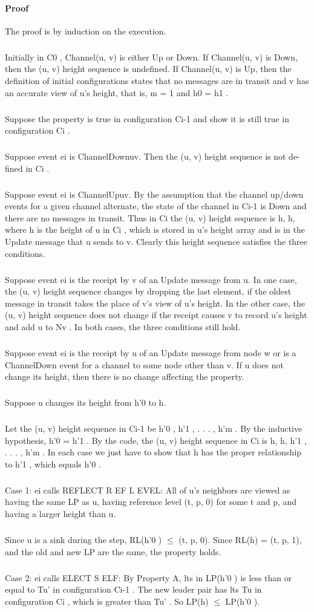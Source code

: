 \paragraph{Proof}The proof is by induction on the execution.
\subparagraph{}Initially in C0 , Channel(u, v) is either Up or Down. If Channel(u, v) is Down, then the (u, v) height sequence is undefined. If Channel(u, v) is Up, then the definition of initial configurations states that no messages are in transit and v has an accurate view of u’s height, that is, m = 1 and h0 = h1 .
\subparagraph{}Suppose the property is true in configuration Ci-1 and show it is still true in configuration Ci .
\subparagraph{}Suppose event ei is ChannelDownuv. Then the (u, v) height sequence is not de- fined in Ci .
\subparagraph{}Suppose event ei is ChannelUpuv. By the assumption that the channel up/down events for a given channel alternate, the state of the channel in Ci-1 is Down and there are no messages in transit. Thus in Ci the (u, v) height sequence is h, h, where h is the height of u in Ci , which is stored in u’s height array and is in the Update message that u sends to v. Clearly this height sequence satisfies the three conditions.
\subparagraph{}Suppose event ei is the receipt by v of an Update message from u. In one case, the (u, v) height sequence changes by dropping the last element, if the oldest message in transit takes the place of v’s view of u’s height. In the other case, the (u, v) height sequence does not change if the receipt causes v to record u’s height and add u to Nv . In both cases, the three conditions still hold.
\subparagraph{}Suppose event ei is the receipt by u of an Update message from node w or is a ChannelDown event for a channel to some node other than v. If u does not change its height, then there is no change affecting the property.
\subparagraph{}Suppose u changes its height from h'0 to h.
\subparagraph{}Let the (u, v) height sequence in Ci-1 be h'0 , h'1 , . . . , h'm . By the inductive hypothesis, h'0 = h'1 . By the code, the (u, v) height sequence in Ci is h, h, h'1 , . . . , h'm . In each case we just have to show that h has the proper relationship to h'1 , which equals h'0 .
\subparagraph{}Case 1: ei calls REFLECT R EF L EVEL: All of u’s neighbors are viewed as having the same LP as u, having reference level (t, p, 0) for some t and p, and having a larger height than u.
\subparagraph{}Since u is a sink during the step, RL(h'0 ) $\leq$ (t, p, 0). Since RL(h) = (t, p, 1), and the old and new LP are the same, the property holds.
\subparagraph{}Case 2: ei calls ELECT S ELF: By Property A, lts in LP(h'0 ) is less than or equal to Tu' in configuration Ci-1 . The new leader pair has lts Tu in configuration Ci , which is greater than Tu' . So LP(h) $\leq$ LP(h'0 ).

